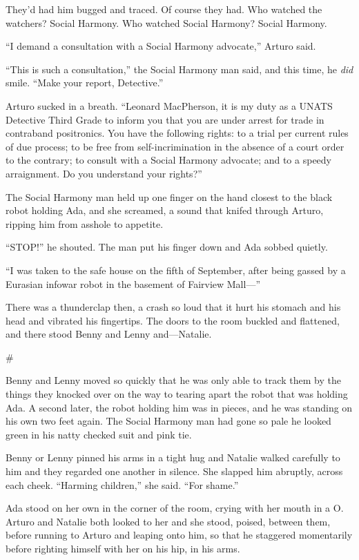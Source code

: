 They’d had him bugged and traced. Of course they had. Who watched
the watchers? Social Harmony. Who watched Social Harmony? Social
Harmony.

“I demand a consultation with a Social Harmony advocate,” Arturo
said.

“This is such a consultation,” the Social Harmony man said, and
this time, he \emph{did} smile. “Make your report, Detective.”

Arturo sucked in a breath. “Leonard MacPherson, it is my duty as a
UNATS Detective Third Grade to inform you that you are under arrest
for trade in contraband positronics. You have the following rights:
to a trial per current rules of due process; to be free from
self-incrimination in the absence of a court order to the contrary;
to consult with a Social Harmony advocate; and to a speedy
arraignment. Do you understand your rights?”

The Social Harmony man held up one finger on the hand closest to
the black robot holding Ada, and she screamed, a sound that knifed
through Arturo, ripping him from asshole to appetite.

“STOP!” he shouted. The man put his finger down and Ada sobbed
quietly.

“I was taken to the safe house on the fifth of September, after
being gassed by a Eurasian infowar robot in the basement of
Fairview Mall—”

There was a thunderclap then, a crash so loud that it hurt his
stomach and his head and vibrated his fingertips. The doors to the
room buckled and flattened, and there stood Benny and Lenny
and—Natalie.

\#

Benny and Lenny moved so quickly that he was only able to track
them by the things they knocked over on the way to tearing apart
the robot that was holding Ada. A second later, the robot holding
him was in pieces, and he was standing on his own two feet again.
The Social Harmony man had gone so pale he looked green in his
natty checked suit and pink tie.

Benny or Lenny pinned his arms in a tight hug and Natalie walked
carefully to him and they regarded one another in silence. She
slapped him abruptly, across each cheek. “Harming children,” she
said. “For shame.”

Ada stood on her own in the corner of the room, crying with her
mouth in a O. Arturo and Natalie both looked to her and she stood,
poised, between them, before running to Arturo and leaping onto
him, so that he staggered momentarily before righting himself with
her on his hip, in his arms.

